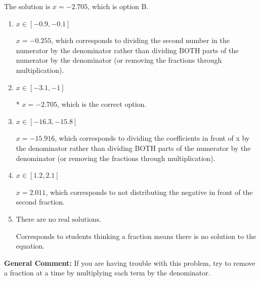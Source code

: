 \documentclass{extbook}[14pt]
\begin{document}
\begin{enumerate}
{The solution is \( x = -2.705 \), which is option B.\begin{enumerate}[label=\Alph*.]
\item \( x \in [-0.9, -0.1] \)

 $x = -0.255$, which corresponds to dividing the second number in the numerator by the denominator rather than dividing BOTH parts of the numerator by the denominator (or removing the fractions through multiplication).
\item \( x \in [-3.1, -1] \)

* $x = -2.705$, which is the correct option.
\item \( x \in [-16.3, -15.8] \)

 $x = -15.916$, which corresponds to dividing the coefficients in front of x by the denominator rather than dividing BOTH parts of the numerator by the denominator (or removing the fractions through multiplication).
\item \( x \in [1.2, 2.1] \)

 $x = 2.011$, which corresponds to not distributing the negative in front of the second fraction.
\item \( \text{There are no real solutions.} \)

Corresponds to students thinking a fraction means there is no solution to the equation.
\end{enumerate}

\textbf{General Comment:} If you are having trouble with this problem, try to remove a fraction at a time by multiplying each term by the denominator.
}
\end{enumerate}
\end{document}
